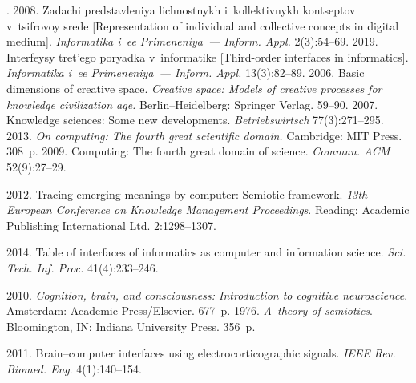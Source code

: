   \begin{multicols}{2}

\renewcommand{\bibname}{\protect\rmfamily References}

{\small\frenchspacing
 {%
 \begin{thebibliography}{99}
. 2008. Zadachi 
predstavleniya lichnostnykh i~kollektivnykh kontseptov v~tsifrovoy srede 
[Representation of individual and collective concepts in digital medium]. 
\textit{Informatika 
i~ee Primeneniya~--- Inform. Appl.} 2(3):54--69.
 2019. Interfeysy tret'ego poryadka v~informatike [Third-order 
interfaces in informatics]. \textit{Informatika i~ee Primeneniya~--- Inform. Appl.} 
13(3):82--89. 
 2006. Basic dimensions of creative 
space. \textit{Creative space: Models of creative processes for knowledge civilization 
age.} Berlin--Heidelberg: Springer Verlag. 59--90.
 2007. Knowledge sciences: Some new 
developments. \textit{Betriebswirtsch} 77(3):271--295.
 2013. \textit{On computing: The fourth great scientific 
domain.} Cambridge: MIT Press. 308~p.
 2009. Computing: The fourth great domain 
of science. \textit{Commun. ACM} 52(9):27--29.

 2012. Tracing emerging meanings by computer: Semiotic 
framework. \textit{13th European Conference on Knowledge Management 
Proceedings}. Reading: Academic Publishing International Ltd. 2:1298--1307.

 2014. Table of interfaces of informatics as computer and information 
science. \textit{Sci. Tech. Inf. Proc.} 41(4):233--246.

 2010. \textit{Cognition, brain, and consciousness: 
Introduction to cognitive neuroscience}. Amsterdam: Academic Press/Elsevier. 
677~p.
 1976. \textit{A~theory of semiotics}. Bloomington, IN: Indiana University 
Press. 356~p.


 2011. Brain--computer interfaces using 
electrocorticographic signals. \textit{IEEE Rev. Biomed. Eng}. 4(1):140--154.


\end{thebibliography}}}
\end{multicols}
